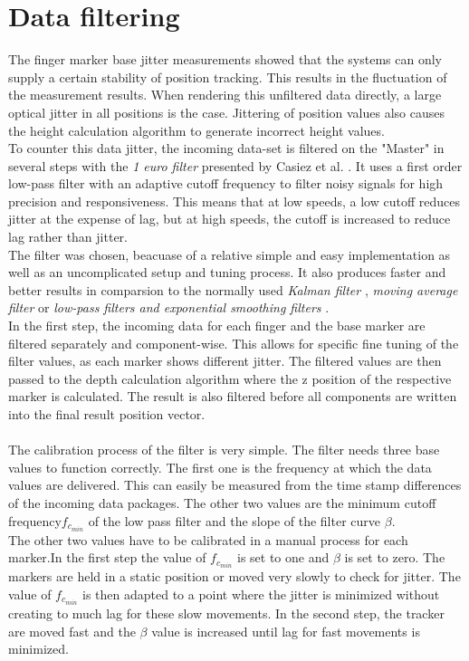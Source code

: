 \section{Data filtering}
The finger marker base jitter measurements showed that the systems can only supply a certain stability of position tracking. This results in the fluctuation of the measurement results. When rendering this unfiltered data directly, a large optical jitter in all positions is the case. Jittering of position values also causes the height calculation algorithm to generate incorrect height values.\\
To counter this data jitter, the incoming data-set is filtered on the "Master" in several steps with the \textit{1 euro filter} presented by Casiez et al. \cite{Casiez.2012}. It uses a first order low-pass filter with an adaptive cutoff frequency to filter noisy signals for high precision and responsiveness. This means that at low speeds, a low cutoff reduces jitter at the expense of lag, but at high speeds, the cutoff is increased to reduce lag rather than jitter.\\
The filter was chosen, beacuase of a relative simple and easy implementation as well as an uncomplicated setup and tuning process. It also produces faster and better results in comparsion to the normally used \textit{Kalman filter} \cite{Welch.2001}, \textit{moving average filter} or \textit{low-pass filters and exponential smoothing filters} \cite{LaViola.2003}.
\\ In the first step, the incoming data for each finger and the base marker  are filtered separately and component-wise. This allows for specific fine tuning of the filter values, as each marker shows different jitter. The filtered values are then passed to the depth calculation algorithm where the z position of the respective marker is calculated. The result is also filtered before all components are written into the final result position vector.
\\\\The calibration process of the filter is very simple. The filter needs three base values to function correctly. The first one is the frequency at which the data values are delivered. This can easily be measured from the time stamp differences of the incoming data packages. The other two values are the minimum cutoff frequency$f_{c_{min}} $ of the low pass filter and the slope of the filter curve $\beta$.
\\The other two values have to be calibrated in a manual process for each marker.In the first step the value of $f_{c_{min}} $ is set to one and $\beta$ is set to zero. The markers are held in a static position or moved very slowly to check for jitter. The value of $f_{c_{min}} $ is then adapted to a point where the jitter is minimized without creating to much lag for these slow movements. In the second step, the tracker are moved fast and the $\beta$ value is increased until lag for fast movements is minimized.
